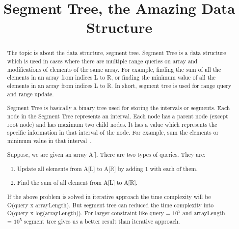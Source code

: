 \documentclass[conference,column]{IEEEtran}
\begin{document}
\title{Segment Tree, the Amazing Data Structure}
\author{}

\maketitle


\begin{abstract}
The topic is about the data structure, segment tree. Segment Tree is a data structure which is used in cases where there are multiple range queries on array and modifications of elements of the same array. For example, finding the sum of all the elements in an array from indices L to R, or finding the minimum value of all the elements in an array from indices L to R. In short, segment tree is used for range query and range update.


Segment Tree is basically a binary tree used for storing the intervals or segments. Each node in the Segment Tree represents an interval. Each node has a parent node (except root node) and has maximum two child nodes. It has a value which represents the specific information in that interval of the node. For example, sum the elements or minimum value in that interval~\cite{typeee}.


Suppose, we are given an array A[]. There are two types of queries. They are:
\begin{enumerate}
	\item Update all elements from A[L] to A[R] by adding 1 with each of them.
	\item Find the sum of all element from A[L] to A[R].
\end{enumerate}


If the above problem is solved in iterative approach the time complexity will be 
O(query x arrayLength). But segment tree can reduced the time complexity into O(query x log(arrayLength)). For larger constraint like query = $10^5$ and arrayLength = $ 10^5 $
segment tree gives us a better result than iterative approach.

\end{abstract}
\end{document}
